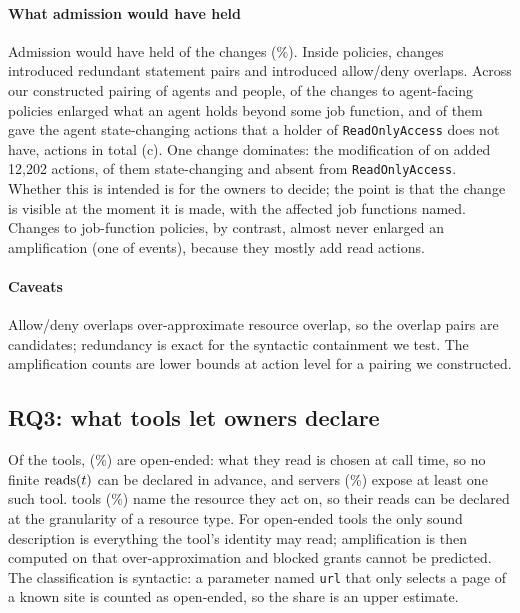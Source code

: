 \paragraph{What admission would have held} Admission would have held \awsHeld{} of the \awsEvents{} changes (\awsHeldPct\%). Inside policies, \awsRedEv{} changes introduced \awsRedPairs{} redundant statement pairs and \awsOvEv{} introduced allow/deny overlaps. Across our constructed pairing of agents and people, \awsAmpEv{} of the \awsAgentEv{} changes to agent-facing policies enlarged what an agent holds beyond some job function, and \awsAmpROEv{} of them gave the agent state-changing actions that a holder of \texttt{ReadOnlyAccess} does not have, \awsAmpROAct{} actions in total (c). One change dominates: the modification of \texttt{\awsTopPol} on \awsTopDate{} added 12,202 actions, \awsTopAct{} of them state-changing and absent from \texttt{ReadOnlyAccess}. Whether this is intended is for the owners to decide; the point is that the change is visible at the moment it is made, with the affected job functions named. Changes to job-function policies, by contrast, almost never enlarged an amplification (one of \awsJobEv{} events), because they mostly add read actions.

\paragraph{Caveats} Allow/deny overlaps over-approximate resource overlap, so the \awsOvPairs{} overlap pairs are candidates; redundancy is exact for the syntactic containment we test. The amplification counts are lower bounds at action level for a pairing we constructed.

\subsection{RQ3: what tools let owners declare}\label{sec:census}
Of the \csTools{} tools, \csOpen{} (\csOpenPct\%) are open-ended: what they read is chosen at call time, so no finite $\mathrm{reads}(t)$ can be declared in advance, and \csSrvOpen{} servers (\csSrvOpenPct\%) expose at least one such tool. \csRes{} tools (\csResPct\%) name the resource they act on, so their reads can be declared at the granularity of a resource type. For open-ended tools the only sound description is everything the tool's identity may read; amplification is then computed on that over-approximation and blocked grants cannot be predicted. The classification is syntactic: a parameter named \texttt{url} that only selects a page of a known site is counted as open-ended, so the share is an upper estimate.

